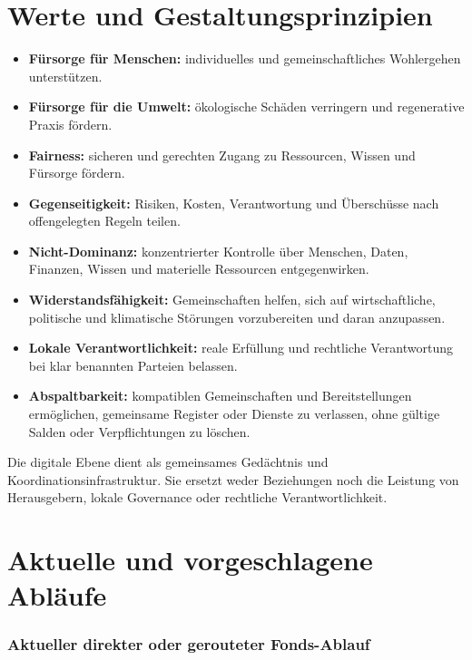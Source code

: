 \documentclass[11pt]{article}
\begin{document}
\section*{Werte und Gestaltungsprinzipien}

\begin{itemize}[leftmargin=*]
\item \textbf{Fürsorge für Menschen:} individuelles und gemeinschaftliches Wohlergehen unterstützen.
\item \textbf{Fürsorge für die Umwelt:} ökologische Schäden verringern und regenerative Praxis fördern.
\item \textbf{Fairness:} sicheren und gerechten Zugang zu Ressourcen, Wissen und Fürsorge fördern.
\item \textbf{Gegenseitigkeit:} Risiken, Kosten, Verantwortung und Überschüsse nach offengelegten Regeln teilen.
\item \textbf{Nicht-Dominanz:} konzentrierter Kontrolle über Menschen, Daten, Finanzen, Wissen und materielle Ressourcen entgegenwirken.
\item \textbf{Widerstandsfähigkeit:} Gemeinschaften helfen, sich auf wirtschaftliche, politische und klimatische Störungen vorzubereiten und daran anzupassen.
\item \textbf{Lokale Verantwortlichkeit:} reale Erfüllung und rechtliche Verantwortung bei klar benannten Parteien belassen.
\item \textbf{Abspaltbarkeit:} kompatiblen Gemeinschaften und Bereitstellungen ermöglichen, gemeinsame Register oder Dienste zu verlassen, ohne gültige Salden oder Verpflichtungen zu löschen.
\end{itemize}
Die digitale Ebene dient als gemeinsames Gedächtnis und Koordinationsinfrastruktur. Sie ersetzt weder Beziehungen noch die Leistung von Herausgebern, lokale Governance oder rechtliche Verantwortlichkeit.

\section*{Aktuelle und vorgeschlagene Abläufe}

\subsubsection*{Aktueller direkter oder gerouteter Fonds-Ablauf}
\end{document}
